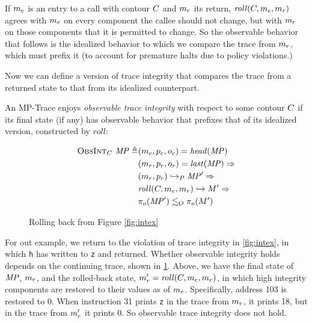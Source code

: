 \documentclass[acmsmall,review,anonymous]{acmart}\settopmatter{printfolios=true,printccs=false,printacmref=false}
\begin{document}
      If \(m_e\) is an entry to a call with contour \(C\) and
      \(m_r\) its return, \(\mathit{roll}(C,m_e,m_r)\)
      agrees with \(m_e\) on every component the callee should not change,
      but with \(m_r\) on those components that it is permitted to change.
      So the observable behavior that follows is the idealized behavior to
      which we compare the trace from \(m_r\), which must prefix it (to
      account for premature halts due to policy violations.)

      Now we can define a version of trace integrity that compares the trace
      from a returned state to that from its idealized counterpart.


      An MP-Trace enjoys {\em observable trace integrity} with respect to
      some contour \(C\) if its final state (if any) has observable
      behavior that prefixes that of its idealized version, constructed by
      \(\mathit{roll}\):

      \[\begin{split}
        \text{\sc ObsInt}_C ~ \mathit{MP} \triangleq
        & (m_e,p_e,o_e) = \mathit{head}(\mathit{MP}) \\
        & (m_r,p_r,o_r) = \mathit{last}(\mathit{MP}) \Rightarrow \\
        & (m_r,p_r) \hookrightarrow_P \mathit{MP}' \Rightarrow \\
        & \mathit{roll}(C,m_e,m_r) \hookrightarrow M'
          \Rightarrow \\
        & \pi_o(\mathit{MP}') \lesssim_O \pi_o(M')
      \end{split}\]

    \begin{figure}
      \integritylazyexample
      \caption{Rolling back from Figure \ref{fig:intex}}
      \label{fig:intlex}
    \end{figure}

    For out example, we return to the violation of trace integrity in
    \cref{fig:intex}, in which {\tt h} has written to {\tt z} and returned.
    Whether observable integrity holds depends on the continuing trace, shown
    in \cref{fig:intlex}. Above, we have the final state of \(\mathit{MP}\),
    \(m_r\), and the rolled-back state, \(m_r' =
    \mathit{roll}(C,m_e,m_r)\), in which high integrity
    components are restored to their values as of \(m_e\). Specifically,
    address 103 is restored to 0. When instruction 31 prints {\tt z} in the
    trace from \(m_r\), it prints 18, but in the trace from \(m_r'\)
    it prints 0. So observable trace integrity does not hold.
\end{document}
